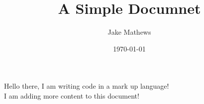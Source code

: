 \documentclass{article}
\title{A Simple Documnet}
\date{\today}
\author{Jake Mathews}
\begin{document}
\maketitle
\newpage

Hello there, I am writing code in a mark up language!\\

\noindent I am adding more content to this document!
\end{document}

